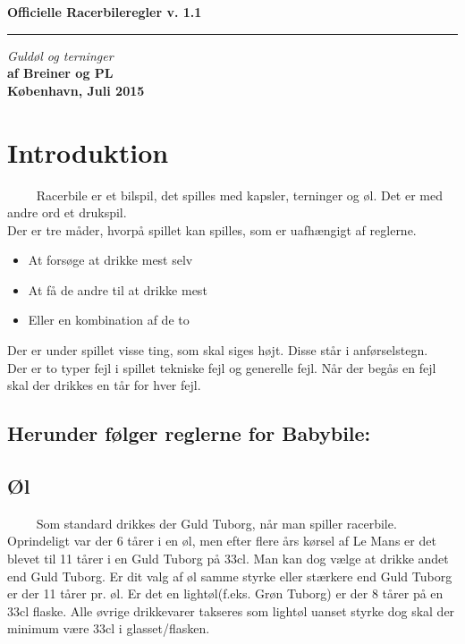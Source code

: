 \documentclass[12pt]{article}
\begin{document}
 \begin{flushright}
  {\Huge\bfseries Officielle Racerbileregler v. 1.1}\\
  \rule{\textwidth}{2pt}
  {\large\itshape Guldøl og terninger}\\
  {\bfseries af Breiner og PL\\[4ex]
K\o benhavn, Juli 2015\\}
 \end{flushright}
 \thispagestyle{empty}
 \clearpage

\newpage

\section*{Introduktion}

$\qquad$ Racerbile er et bilspil, det spilles med kapsler, terninger og øl. Det er med andre ord et drukspil.\\
Der er tre måder, hvorpå spillet kan spilles, som er uafhængigt af reglerne.
\begin{itemize}
	\item At forsøge at drikke mest selv
	\item At få de andre til at drikke mest
	\item Eller en kombination af de to
\end{itemize}

Der er under spillet visse ting, som skal siges højt. Disse står i anførselstegn.\\

Der er to typer fejl i spillet tekniske fejl og generelle fejl. Når der begås en fejl skal der drikkes en tår for hver fejl.\\

\subsection*{Herunder følger reglerne for Babybile:}

\subsection*{Øl}

$\qquad$ Som standard drikkes der Guld Tuborg, når man spiller racerbile. Oprindeligt var der 6 tårer i en øl, men efter flere års kørsel af Le Mans er det blevet til 11 tårer i en Guld Tuborg på 33cl. Man kan dog vælge at drikke andet end Guld Tuborg. Er dit valg af øl samme styrke eller stærkere end Guld Tuborg er der 11 tårer pr. øl. Er det en lightøl(f.eks. Grøn Tuborg) er der 8 tårer på en 33cl flaske. Alle øvrige drikkevarer takseres som lightøl uanset styrke dog skal der minimum være 33cl i glasset/flasken.
\end{document}
